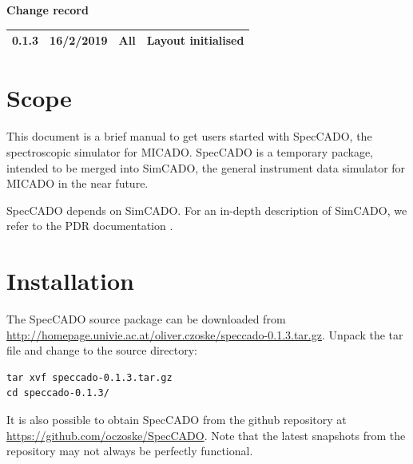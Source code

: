 \documentclass[a4paper,twoside,11pt]{article}
\begin{document}
\lstset{basicstyle=\ttfamily}
\dmdmaketitle


\begin{center}
  \textbf{Change record}

  \tabletail{\hline}

  \begin{supertabular}{|l|l|l|l|}
   0.1.3 & 16/2/2019 & All & Layout initialised \\
   \hline
  \end{supertabular}

\end{center}


\setcounter{tocdepth}{2}
\tableofcontents
\cleardoublepage


\section{Scope}
\label{sec:scope}

This document is a brief manual to get users started with SpecCADO,
the spectroscopic simulator for MICADO. SpecCADO is a temporary
package, intended to be merged into SimCADO, the general instrument
data simulator for MICADO in the near future.

SpecCADO depends on SimCADO. For an in-depth description of SimCADO,
we refer to the PDR documentation \cite{SimCADO-PDR}.

\section{Installation}
\label{sec:installation}

The SpecCADO source package can be downloaded from
\url{http://homepage.univie.ac.at/oliver.czoske/speccado-0.1.3.tar.gz}. Unpack
the tar file and change to the source directory:
\begin{lstlisting}[style=csh]
tar xvf speccado-0.1.3.tar.gz
cd speccado-0.1.3/
\end{lstlisting}
It is also possible to obtain SpecCADO from the github repository at
\url{https://github.com/oczoske/SpecCADO}. Note that the latest
snapshots from the repository may not always be perfectly functional.
\end{document}
